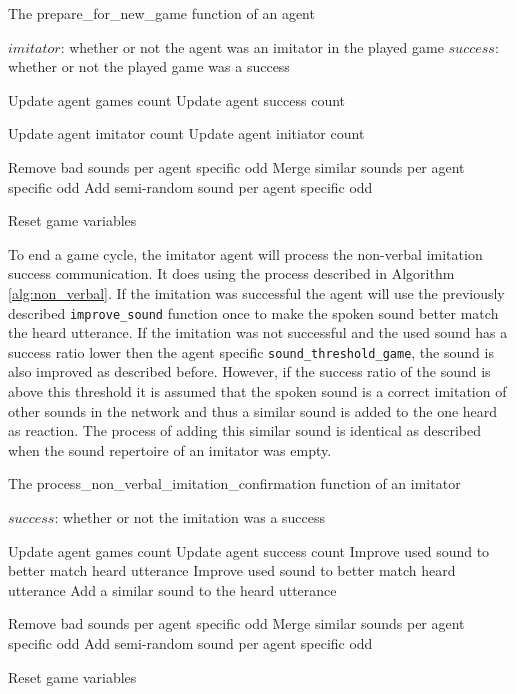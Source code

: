 
\begin{algorithm}[hbt!]
\caption{The prepare\_for\_new\_game function of an agent}\label{alg:prepare_new}
\begin{algorithmic}
\Require $imitator$: whether or not the agent was an imitator in the played game
\Require $success$: whether or not the played game was a success

\State Update agent games count
    \State Update agent success count
\EndIf

    \State Update agent imitator count
\Else
    \State Update agent initiator count
\EndIf

\State Remove bad sounds per agent specific odd
\State Merge similar sounds per agent specific odd
\State Add semi-random sound per agent specific odd

\State Reset game variables

\end{algorithmic}
\end{algorithm}

\newpage
To end a game cycle, the imitator agent will process the non-verbal imitation success communication.
It does using the process described in Algorithm \ref{alg:non_verbal}.
If the imitation was successful the agent will use the previously described \texttt{improve\_sound} function once to make the spoken sound better match the heard utterance.
If the imitation was not successful and the used sound has a success ratio lower then the agent specific \texttt{sound\_threshold\_game}, the sound is also improved as described before.
However, if the success ratio of the sound is above this threshold it is assumed that the spoken sound is a correct imitation of other sounds in the network and thus a similar sound is added to the one heard as reaction.
The process of adding this similar sound is identical as described when the sound repertoire of an imitator was empty.


\begin{algorithm}[hbt!]
\caption{The process\_non\_verbal\_imitation\_confirmation function of an imitator}\label{alg:non_verbal}
\begin{algorithmic}
\Require $success$: whether or not the imitation was a success


\State Update agent games count
    \State Update agent success count
    \State Improve used sound to better match heard utterance
    \State Improve used sound to better match heard utterance
\Else
    \State Add a similar sound to the heard utterance
\EndIf

\State Remove bad sounds per agent specific odd
\State Merge similar sounds per agent specific odd
\State Add semi-random sound per agent specific odd

\State Reset game variables

\end{algorithmic}
\end{algorithm}

